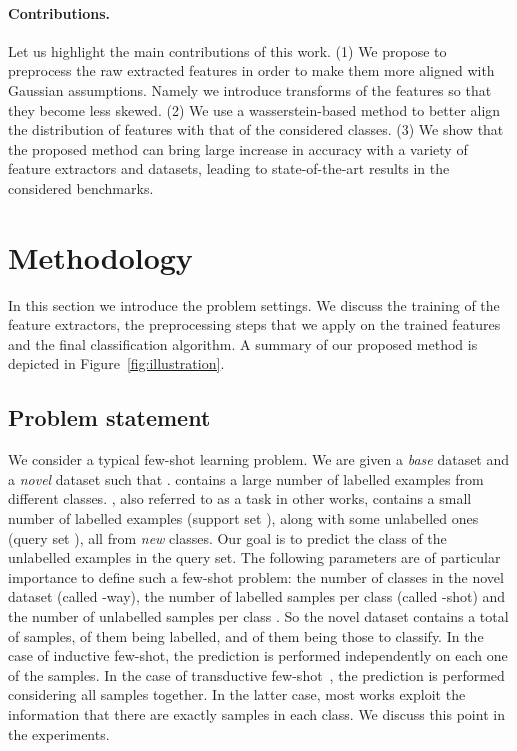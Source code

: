 \documentclass[twoside]{article}
\begin{document}
\paragraph{Contributions.} Let us highlight the main contributions of this work. (1) We propose to preprocess the raw extracted features in order to make them more aligned with Gaussian assumptions. Namely we introduce transforms of the features so that they become less skewed. (2) We use a wasserstein-based method to better align the distribution of features with that of the considered classes. (3) We show that the proposed method can bring large increase in accuracy with a variety of feature extractors and datasets, leading to state-of-the-art results in the considered benchmarks.

\section{Methodology}
\label{methodology}

In this section we introduce the problem settings. We discuss the training of the feature extractors, the preprocessing steps that we apply on the trained features and the final classification algorithm. A summary of our proposed method is depicted in Figure~\ref{fig:illustration}.

\subsection{Problem statement}

We consider a typical few-shot learning problem. We are given a \emph{base} dataset  and a \emph{novel} dataset  such that .  contains a large number of labelled examples from  different classes. , also referred to as a task in other works, contains a small number of labelled examples (support set ), along with some unlabelled ones (query set ), all from  \emph{new} classes. Our goal is to predict the class of the unlabelled examples in the query set. The following parameters are of particular importance to define such a few-shot problem: the number of classes in the novel dataset  (called -way), the number of labelled samples per class  (called -shot) and the number of unlabelled samples per class . So the novel dataset contains a total of  samples,  of them being labelled, and  of them being those to classify. In the case of inductive few-shot, the prediction is performed independently on each one of the  samples. In the case of transductive few-shot~\cite{liu2018learning, lichtenstein2020tafssl}, the prediction is performed considering all  samples together. In the latter case, most works exploit the information that there are exactly  samples in each class. We discuss this point in the experiments.
\end{document}
